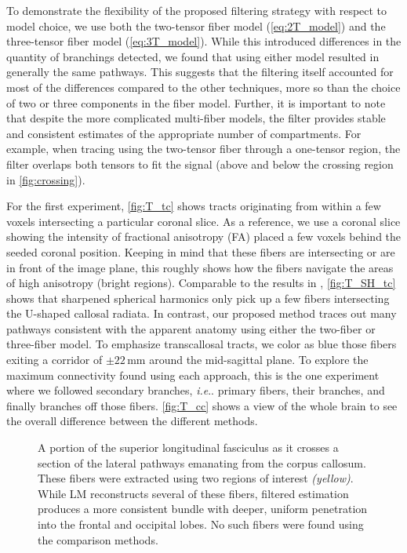 \documentclass[final,hyperref]{gatech-thesis}
\makeatletter
\DeclareRobustCommand\onedot{\futurelet\@let@token\@onedot}
\def\@onedot{\ifx\@let@token.\else.\null\fi\xspace}
\newcommand{\ie}{\textit{i.e}\onedot}
\makeatother
\begin{document}
To demonstrate the flexibility of the proposed filtering strategy with respect
to model choice, we use both the two-tensor fiber model
(\autoref{eq:2T_model}) and the three-tensor fiber model
(\autoref{eq:3T_model}).  While this introduced differences in the quantity of
branchings detected, we found that using either model resulted in generally
the same pathways.  This suggests that the filtering itself accounted for most
of the differences compared to the other techniques, more so than the choice
of two or three components in the fiber model.  Further, it is important to
note that despite the more complicated multi-fiber models, the filter provides
stable and consistent estimates of the appropriate number of compartments.
For example, when tracing using the two-tensor fiber through a one-tensor
region, the filter overlaps both tensors to fit the signal (above and below
the crossing region in \autoref{fig:crossing}).

For the first experiment, \autoref{fig:T_tc} shows tracts originating from
within a few voxels intersecting a particular coronal slice.  As a reference,
we use a coronal slice showing the intensity of fractional anisotropy (FA)
placed a few voxels behind the seeded coronal position.  Keeping in mind that
these fibers are intersecting or are in front of the image plane, this roughly
shows how the fibers navigate the areas of high anisotropy (bright regions).
Comparable to the results in \cite{Descoteaux2009tmi,Schultz2008},
\autoref{fig:T_SH_tc} shows that sharpened spherical harmonics only pick up a
few fibers intersecting the U-shaped callosal radiata.  In contrast, our
proposed method traces out many pathways consistent with the apparent anatomy
using either the two-fiber or three-fiber model.  To emphasize transcallosal
tracts, we color as blue those fibers exiting a corridor of $\pm22\,\text{mm}$
around the mid-sagittal plane.  To explore the maximum connectivity found
using each approach, this is the one experiment where we followed secondary
branches, \ie primary fibers, their branches, and finally branches off those
fibers.  \autoref{fig:T_cc} shows a view of the whole brain to see the overall
difference between the different methods.

\begin{figure}[t]
  \centering
  \caption{A portion of the superior longitudinal fasciculus as it crosses a
    section of the lateral pathways emanating from the corpus callosum.  These
    fibers were extracted using two regions of interest \textit{(yellow)}.
    While LM reconstructs several of these fibers, filtered estimation
    produces a more consistent bundle with deeper, uniform penetration into
    the frontal and occipital lobes.  No such fibers were found using the
    comparison methods.}
  \label{fig:slf}
\end{figure}
\end{document}
